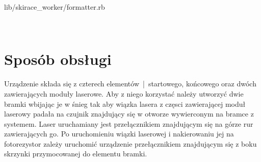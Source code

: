 \documentclass[11pt,a4paper, twoside]{article}
\begin{document}
\begin{listing}
\inputminted[linenos=true]{ruby}{./src/formatter.rb}
\caption{lib/skirace\_worker/formatter.rb}
$\label{formatter}$
\end{listing}
\section{Sposób obsługi}
Urządzenie składa się z czterech elementów~|~startowego, końcowego oraz dwóch zawierających moduły laserowe. Aby z niego korzystać należy utworzyć dwie bramki wbijając je w śnieg tak aby wiązka lasera z częsci zawierającej moduł laserowy padała na czujnik znajdujący się w otworze wywierconym na bramce z systemem. Laser uruchamiany jest przełącznikiem znajdującym się na górze rur zawierających go. Po uruchomieniu wiązki laserowej i nakierowaniu jej na fotorezystor zależy uruchomić urządzenie przełącznikiem znajdującym się z boku skrzynki przymocowanej do elementu bramki.
\end{document}

